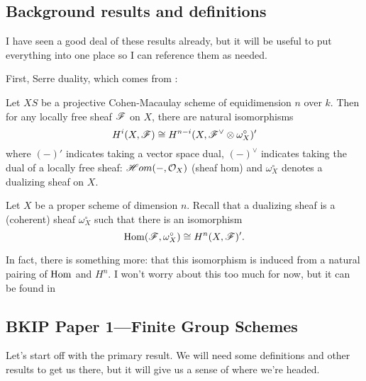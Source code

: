 \documentclass[12pt]{article}
\begin{document}
\subsection{Background results and definitions}
I have seen a good deal of these results already, but it will be useful to put everything into one place so I can reference them as needed.

First, Serre duality, which comes from \cite{hartshorneAG}:
\begin{thm}
	Let $XS$ be a projective Cohen-Macaulay scheme of equidimension $n$ over $k$. Then for any locally free sheaf $\mathscr{F}$ on $X$, 
	there are natural isomorphisms
	\[H^i(X,\mathscr{F})\cong H^{n-i}(X,\mathscr{F}^\vee\otimes \omega_X^\circ)'\]
	where $(-)'$ indicates taking a vector space dual, $(-)^\vee$ indicates taking the dual of a locally free sheaf:
	$\mathscr Hom(-,\mathcal{O}_X)$ (sheaf hom) and $\omega_X^\circ$ denotes a dualizing sheaf on $X$.
\end{thm}

\begin{defn}
	Let $X$ be a proper scheme of dimension $n$. Recall that a dualizing sheaf is a (coherent) sheaf $\omega_X^\circ$ such that there is an isomorphism 
	\[\operatorname{Hom}(\mathscr{F},\omega_X^\circ)\cong H^n(X,\mathscr{F})'.\]
\end{defn}
\begin{rmk}
	In fact, there is something more: that this isomorphism is induced from a natural pairing of $\operatorname{Hom}$ and $H^n$. I won't worry 
	about this too much for now, but it can be found in \cite[p. 240]{hartshorneAG}
\end{rmk}

\subsection{BKIP Paper 1---Finite Group Schemes}
Let's start off with the primary result. We will need some definitions and other results to get us there, but it will give us a sense of 
where we're headed.
\begin{thm}[BKIP) `18]

\end{thm}

\medskip

\printbibliography
\end{document}
